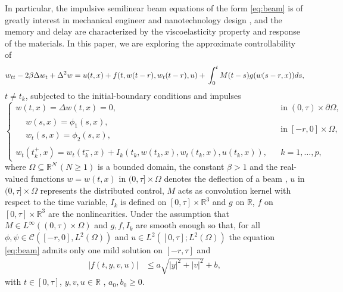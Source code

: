 \documentclass[11 pt]{amsart}
\begin{document}
In particular, the impulsive semilinear beam equations of the form \eqref{eq:beam} is of greatly interest  in mechanical engineer and nanotechnology design \cite{Wang-Tan:2006aa,Wang-Zhang:2006aa}, and the memory and delay are characterized by the viscoelasticity property  and response of the materials. In this paper, we are exploring the  approximate  controllability of
\begin{equation}\label{eq:beam}
 w_{tt}  -  2\beta\Delta w_t + \Delta^{2}w = u(t,x) + f(t,w(t-r),w_{t}(t-r),u)+{\displaystyle} \int_{0}^{t}M(t-s)g(w(s-r,x))ds,
\end{equation}
$t \neq t_k$, subjected to the initial-boundary conditions and impulses
\begin{equation}\label{eq:initial}
\left\{\begin{array}{lcl}
 w(t,x)=\Delta w (t,x)=0, &&\mbox{in}\; (0, \tau) \times \partial \Omega,\\
 \begin{split}
 &w(s,x)=\phi_1(s,x),\\
 &w_{t}(s,x)=\phi_2(s,x),
 \end{split} && \mbox{in} \; [-r,0] \times \Omega,\\
 w_{t}(t_{k}^{+},x) = w_{t}(t_{k}^{-},x)+I_{k}(t_k,w(t_{k},x),w_{t}(t_{k},x),u(t_{k},x)),& & k=1, \dots, p,
  \end{array}
 \right.
\end{equation}
where   $\Omega \subseteq {\mathbb{R}}^{N} \,(N\geq1)$ is a bounded  domain, the constant  $\beta > 1$ and the real-valued functions $w = w(t,x)$  in $(0, \tau] \times  \Omega$ denotes the deflection of a beam , $u$ in $(0, \tau] \times  \Omega$ represents the distributed control, $M$ acts as convolution kernel with respect to the time variable, $I_k$ is defined on $[0, \tau] \times {\mathbb{R}}^3$  and $g$ on ${\mathbb{R}}$,  $f$ on $[0, \tau] \times {\mathbb{R}}^3$ are the nonlinearities. Under the assumption
that $M\in L^{\infty}((0,\tau)\times \Omega)$ and  $g, f, I_{k}$  are smooth enough so that, for all $\phi, \psi\in {\mathcal{C}}([-r,0],L^{2}(\Omega))$ and $u\in L^{2}([0,\tau]; L^{2}(\Omega))$ the equation \eqref{eq:beam} admits only one mild solution on $[-r,\tau]$ and
\begin{equation}\label{eq:f1}
    \begin{array}{ll}
|f(t,y,v,u)|  & \leq a\sqrt{|y |^2+ |v |^2} +b,
\end{array}
\end{equation}
with $t\in [0,\tau]$, $y,v, u\in {\mathbb{R}}$  ,  $a_{0},b_{0}\geq 0$.
\end{document}
